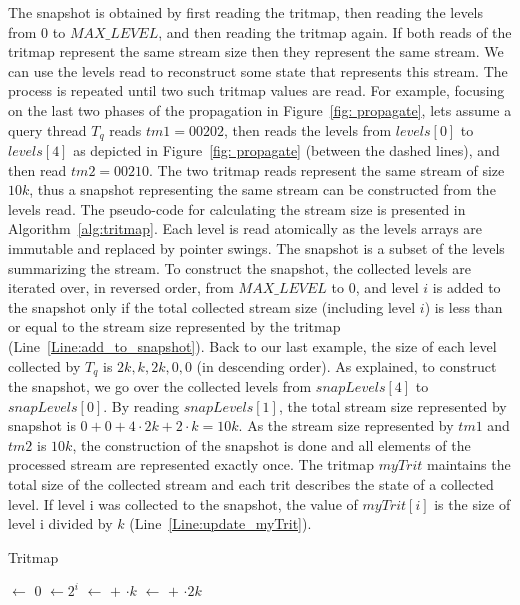 The snapshot is obtained by first reading the tritmap, then reading the levels from $0$ to $MAX\_LEVEL$, and then reading the tritmap again. If both reads of the tritmap represent the same stream size then they represent the same stream. We can use the levels read to reconstruct some state that represents this stream. The process is repeated until two such tritmap values are read. For example, focusing on the last two phases of the propagation in Figure~\ref{fig: propagate}, lets assume a query thread $T_q$ reads $tm1=00202$, then reads the levels from $\mathit{levels[0]}$ to $\mathit{levels[4]}$ as depicted in Figure~\ref{fig: propagate} (between the dashed lines), and then read $tm2=00210$. The two tritmap reads represent the same stream of size $10k$, thus a snapshot representing the same stream can be constructed from the levels read. The pseudo-code for calculating the stream size is presented in Algorithm~\ref{alg:tritmap}. Each level is read atomically as the levels arrays are immutable and replaced by pointer swings. The snapshot is a subset of the levels summarizing the stream. To construct the snapshot, the collected levels are iterated over, in reversed order, from $\mathit{MAX\_LEVEL}$ to $0$, and level $i$ is added to the snapshot only if the total collected stream size (including level $i$) is less than or equal to the stream size represented by the tritmap (Line~\ref{Line:add_to_snapshot}). Back to our last example, the size of each level collected by $T_q$ is ${2k,k,2k,0,0}$ (in descending order). As explained, to construct the snapshot, we go over the collected levels from $\mathit{snapLevels[4]}$ to $\mathit{snapLevels[0]}$. By reading $snapLevels[1]$, the total stream size represented by snapshot is $0+0+4\cdot2k+2\cdot k = 10k$. As the stream size represented by $tm1$ and $tm2$ is $10k$, the construction of the snapshot is done and all elements of the processed stream are represented exactly once. The tritmap $\mathit{myTrit}$ maintains the total size of the collected stream and each trit describes the state of a collected level. If level i was collected to the snapshot, the value of $\mathit{myTrit[i]}$ is the size of level i divided by $k$ (Line~\ref{Line:update_myTrit}). 

 
 
\begin{algorithm}[h]
\caption{Tritmap} \label{alg:tritmap}
\begin{algorithmic}
\setcounter{ALG@line}{\value{mycounter}}
        \State {} $\gets$ 0
            \State {} $\gets 2^i $
                \State {} $\gets$  $+$ $\cdot k$
                     \State {} $\gets$  $+$ $\cdot 2k$
            \EndIf
        \EndFor
        \State {}
\EndProcedure
\setcounter{mycounter}{\value{ALG@line}}
\end{algorithmic}
\end{algorithm}
 

